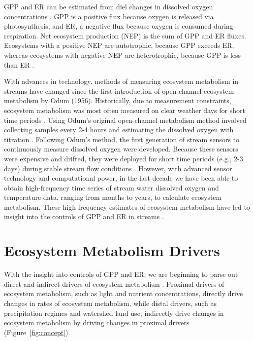 GPP and ER can be estimated from diel changes in dissolved oxygen concentrations \cite{odum_primary_1956}. GPP is a positive flux because oxygen is released via photosynthesis, and ER, a negative flux because oxygen is consumed during respiration. Net ecosystem production (NEP) is the sum of GPP and ER fluxes. Ecosystems with a positive NEP are autotrophic, because GPP exceeds ER, whereas ecosystems with negative NEP are heterotrophic, because GPP is less than ER \cite{lovett_is_2006}. 

With advances in technology, methods of measuring ecosystem metabolism in streams have changed since the first introduction of open-channel ecosystem metabolism by Odum (1956). Historically, due to measurement constraints, ecosystem metabolism was most often measured on clear weather days for short time periods \cite{odum_primary_1956, bernhardt_metabolic_2018}. Using Odum’s original open-channel metabolism method involved collecting samples every 2-4 hours and estimating the dissolved oxygen with titration \cite{odum_primary_1956}. Following Odum’s method, the first generation of stream sensors to continuously measure dissolved oxygen were developed. Because these sensors were expensive and drifted, they were deployed for short time periods (e.g., 2-3 days) during stable stream flow conditions \cite{bernhardt_metabolic_2018}. However, with advanced sensor technology and computational power, in the last decade we have been able to obtain high-frequency time series of stream water dissolved oxygen and temperature data, ranging from months to years, to calculate ecosystem metabolism. These high frequency estimates of ecosystem metabolism have led to insight into the controls of GPP and ER in streams \cite{beaulieu_continuous_2013, arroita_twenty_2019}.


\section{Ecosystem Metabolism Drivers}

With the insight into controls of GPP and ER, we are beginning to parse out direct and indirect drivers of ecosystem metabolism \cite{bernot_inter-regional_2010, fus_land_2017}. Proximal drivers of ecosystem metabolism, such as light and nutrient concentrations, directly drive changes in rates of ecosystem metabolism, while distal drivers, such as precipitation regimes and watershed land use, indirectly drive changes in ecosystem metabolism by driving changes in proximal drivers (Figure~\ref{fig:concept}).

